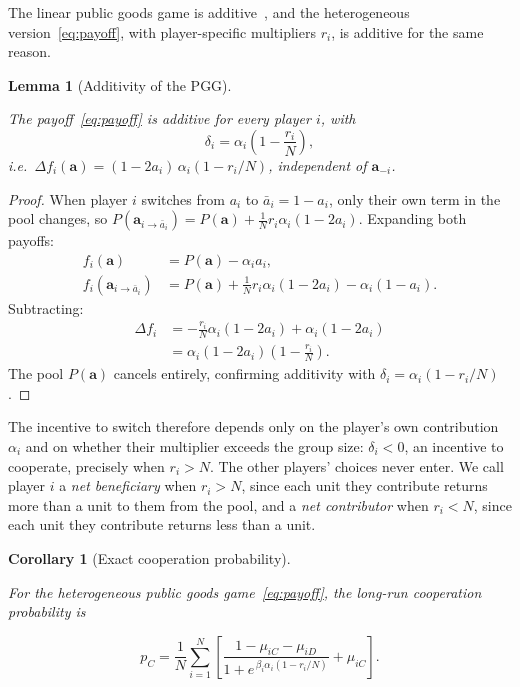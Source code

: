 \documentclass[11pt]{article}
\newtheorem{lemma}{Lemma}
\newtheorem{corollary}{Corollary}
\newcommand{\bfa}{\mathbf{a}}
\newcommand{\pC}{p_C}
\begin{document}
The linear public goods game is additive~\cite{couto2023multiplayer}, and the
heterogeneous version~\eqref{eq:payoff}, with player-specific multipliers \(r_i\), is
additive for the same reason.

\begin{lemma}[Additivity of the PGG]
\label{lem:payoff-identity}

The payoff~\eqref{eq:payoff} is additive for every player \(i\), with
\begin{equation}\label{eq:delta-pi}
  \delta_i = \alpha_i\!\left(1-\frac{r_i}{N}\right),
\end{equation}
i.e.\ \(\Delta f_i(\bfa)=(1-2a_i)\,\alpha_i(1-r_i/N)\), independent of \(\bfa_{-i}\).
\end{lemma}

\begin{proof}
When player \(i\) switches from \(a_i\) to \(\bar{a}_i=1-a_i\), only their own term in
the pool changes, so
\(P(\bfa_{i\to\bar{a}_i}) = P(\bfa)+\tfrac{1}{N}r_i\alpha_i(1-2a_i)\).
Expanding both payoffs:
\begin{align*}
  f_i(\bfa) &= P(\bfa)-\alpha_i a_i, \\
  f_i(\bfa_{i\to\bar{a}_i})
  &= P(\bfa)+\tfrac{1}{N}r_i\alpha_i(1-2a_i)-\alpha_i(1-a_i).
\end{align*}
Subtracting:
\begin{align*}
  \Delta f_i
  &= -\frac{r_i}{N}\alpha_i(1-2a_i) + \alpha_i(1-2a_i) \\
  &= \alpha_i(1-2a_i)\!\left(1-\frac{r_i}{N}\right).
\end{align*}
The pool \(P(\bfa)\) cancels entirely, confirming additivity with
\(\delta_i=\alpha_i(1-r_i/N)\).
\end{proof}

The incentive to switch therefore depends only on the player's own contribution
\(\alpha_i\) and on whether their multiplier exceeds the group size: \(\delta_i<0\),
an incentive to cooperate, precisely when \(r_i>N\). The other players' choices never
enter. We call player \(i\) a \emph{net beneficiary} when \(r_i>N\), since each
unit they contribute returns more than a unit to them from the pool, and a
\emph{net contributor} when \(r_i<N\), since each unit they contribute returns
less than a unit.

\begin{corollary}[Exact cooperation probability]\label{cor:exact-pC}

For the heterogeneous public goods game~\eqref{eq:payoff}, the long-run cooperation
probability is

\begin{equation}\label{eq:pC}
  \boxed{
  \pC = \frac{1}{N}\sum_{i=1}^{N}
        \left[\frac{1-\mu_{iC}-\mu_{iD}}{1+e^{\,\beta_i\alpha_i(1-r_i/N)}}
          +\mu_{iC}\right]
  }.
\end{equation}

\end{corollary}
\end{document}
